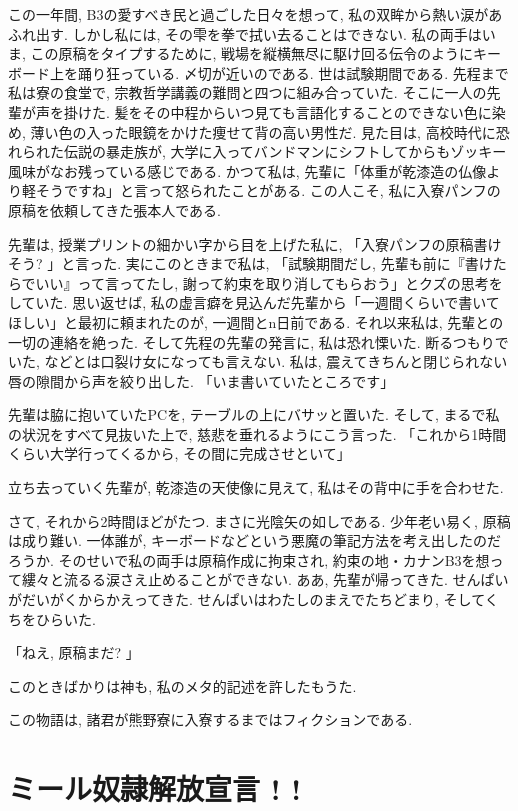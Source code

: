 \documentclass[10pt,b5jsbook,dvips,dvipdfmx,openany]{jsbook}
\theoremstyle{definition}
\begin{document}
	この一年間, B3の愛すべき民と過ごした日々を想って, 私の双眸から熱い涙があふれ出す. しかし私には, その雫を拳で拭い去ることはできない. 私の両手はいま, この原稿をタイプするために, 戦場を縦横無尽に駆け回る伝令のようにキーボード上を踊り狂っている. 〆切が近いのである. 世は試験期間である. 先程まで私は寮の食堂で, 宗教哲学講義の難問と四つに組み合っていた. そこに一人の先輩が声を掛けた. 髪をその中程からいつ見ても言語化することのできない色に染め, 薄い色の入った眼鏡をかけた痩せて背の高い男性だ. 見た目は, 高校時代に恐れられた伝説の暴走族が, 大学に入ってバンドマンにシフトしてからもゾッキー風味がなお残っている感じである. かつて私は, 先輩に「体重が乾漆造の仏像より軽そうですね」と言って怒られたことがある. この人こそ, 私に入寮パンフの原稿を依頼してきた張本人である. 

	先輩は, 授業プリントの細かい字から目を上げた私に, 「入寮パンフの原稿書けそう? 」と言った. 実にこのときまで私は, 「試験期間だし, 先輩も前に『書けたらでいい』って言ってたし, 謝って約束を取り消してもらおう」とクズの思考をしていた. 思い返せば, 私の虚言癖を見込んだ先輩から「一週間くらいで書いてほしい」と最初に頼まれたのが, 一週間とn日前である. それ以来私は, 先輩との一切の連絡を絶った. そして先程の先輩の発言に, 私は恐れ慄いた. 断るつもりでいた, などとは口裂け女になっても言えない. 私は, 震えてきちんと閉じられない唇の隙間から声を絞り出した. 「いま書いていたところです」
	
	先輩は脇に抱いていたPCを, テーブルの上にバサッと置いた. そして, まるで私の状況をすべて見抜いた上で, 慈悲を垂れるようにこう言った. 「これから1時間くらい大学行ってくるから, その間に完成させといて」

	立ち去っていく先輩が, 乾漆造の天使像に見えて, 私はその背中に手を合わせた. 

	さて, それから2時間ほどがたつ. まさに光陰矢の如しである. 少年老い易く, 原稿は成り難い. 一体誰が, キーボードなどという悪魔の筆記方法を考え出したのだろうか. そのせいで私の両手は原稿作成に拘束され, 約束の地・カナンB3を想って縷々と流るる涙さえ止めることができない. ああ, 先輩が帰ってきた. せんぱいがだいがくからかえってきた. せんぱいはわたしのまえでたちどまり, そしてくちをひらいた. 

	「ねえ, 原稿まだ? 」

	このときばかりは神も, 私のメタ的記述を許したもうた. 

	この物語は, 諸君が熊野寮に入寮するまではフィクションである. 



	\section{ミール奴隷解放宣言 ! !}
\end{document}
